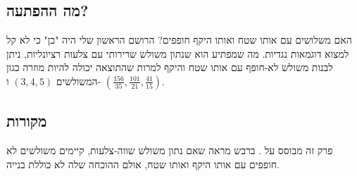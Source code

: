 \newpage

\subsection*{מה ההפתעה?}

האם משלושים עם אותו שטח ואותו היקף חופפים? הרושם הראשון שלי היה "כן" כי לא קל למצוא דוגמאות נגדיות. מה שמפתיע הוא שנתון משולש שרירותי עם צלעות רציונליות, ניתן לבנות משולש לא-חופף עם אותו שטח והיקף למרות שהתוצאה יכולה להיות מוזרה כגון המשולשים
$(3,4,5)$
ו-%
$\left(\frac{156}{35}, \frac{101}{21}, \frac{41}{15}\right)$.


\subsection*{מקורות}

פרק זה מבוסס על 
\cite{mccallum}.
ברבש
\cite{marita}
מראה שאם נתון משולש שווה-צלעות, קיימים משולשים לא חופפים עם אותו היקף ואותו שטח, אולם ההוכחה שלה לא כוללת בנייה. 
